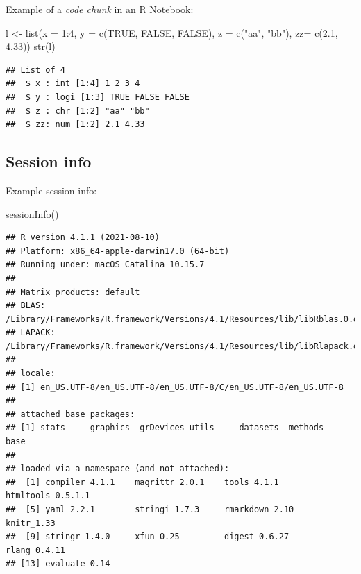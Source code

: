 \documentclass[
  11pt,
]{article}
\newenvironment{Shaded}{\begin{snugshade}}{\end{snugshade}}
\newcommand{\AttributeTok}[1]{\textcolor[rgb]{0.77,0.63,0.00}{#1}}
\newcommand{\ConstantTok}[1]{\textcolor[rgb]{0.00,0.00,0.00}{#1}}
\newcommand{\DecValTok}[1]{\textcolor[rgb]{0.00,0.00,0.81}{#1}}
\newcommand{\FloatTok}[1]{\textcolor[rgb]{0.00,0.00,0.81}{#1}}
\newcommand{\FunctionTok}[1]{\textcolor[rgb]{0.00,0.00,0.00}{#1}}
\newcommand{\NormalTok}[1]{#1}
\newcommand{\OtherTok}[1]{\textcolor[rgb]{0.56,0.35,0.01}{#1}}
\newcommand{\SpecialCharTok}[1]{\textcolor[rgb]{0.00,0.00,0.00}{#1}}
\newcommand{\StringTok}[1]{\textcolor[rgb]{0.31,0.60,0.02}{#1}}
\begin{document}
Example of a \emph{code chunk} in an R Notebook:

\begin{Shaded}
\begin{Highlighting}[]
\NormalTok{l }\OtherTok{\textless{}{-}} \FunctionTok{list}\NormalTok{(}\AttributeTok{x =} \DecValTok{1}\SpecialCharTok{:}\DecValTok{4}\NormalTok{, }\AttributeTok{y =} \FunctionTok{c}\NormalTok{(}\ConstantTok{TRUE}\NormalTok{, }\ConstantTok{FALSE}\NormalTok{, }\ConstantTok{FALSE}\NormalTok{), }\AttributeTok{z =} \FunctionTok{c}\NormalTok{(}\StringTok{"aa"}\NormalTok{, }\StringTok{"bb"}\NormalTok{), }\AttributeTok{zz=} \FunctionTok{c}\NormalTok{(}\FloatTok{2.1}\NormalTok{, }\FloatTok{4.33}\NormalTok{))}
\FunctionTok{str}\NormalTok{(l)}
\end{Highlighting}
\end{Shaded}

\begin{verbatim}
## List of 4
##  $ x : int [1:4] 1 2 3 4
##  $ y : logi [1:3] TRUE FALSE FALSE
##  $ z : chr [1:2] "aa" "bb"
##  $ zz: num [1:2] 2.1 4.33
\end{verbatim}

\hypertarget{session-info}{%
\subsection{Session info}\label{session-info}}

Example session info:

\begin{Shaded}
\begin{Highlighting}[]
\FunctionTok{sessionInfo}\NormalTok{()}
\end{Highlighting}
\end{Shaded}

\begin{verbatim}
## R version 4.1.1 (2021-08-10)
## Platform: x86_64-apple-darwin17.0 (64-bit)
## Running under: macOS Catalina 10.15.7
## 
## Matrix products: default
## BLAS:   /Library/Frameworks/R.framework/Versions/4.1/Resources/lib/libRblas.0.dylib
## LAPACK: /Library/Frameworks/R.framework/Versions/4.1/Resources/lib/libRlapack.dylib
## 
## locale:
## [1] en_US.UTF-8/en_US.UTF-8/en_US.UTF-8/C/en_US.UTF-8/en_US.UTF-8
## 
## attached base packages:
## [1] stats     graphics  grDevices utils     datasets  methods   base     
## 
## loaded via a namespace (and not attached):
##  [1] compiler_4.1.1    magrittr_2.0.1    tools_4.1.1       htmltools_0.5.1.1
##  [5] yaml_2.2.1        stringi_1.7.3     rmarkdown_2.10    knitr_1.33       
##  [9] stringr_1.4.0     xfun_0.25         digest_0.6.27     rlang_0.4.11     
## [13] evaluate_0.14
\end{verbatim}
\end{document}
